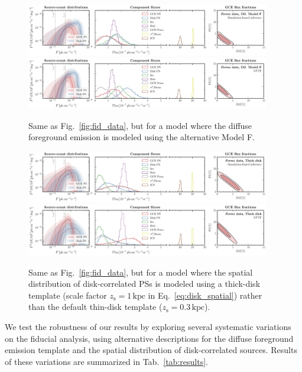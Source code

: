 \documentclass[prd,aps,10pt,nofootinbib,twocolumn,superscriptaddress,preprintnumbers,balancelastpage,longbibliography]{revtex4-1}
\begin{document}
%
\begin{figure}
\centering
\includegraphics[width=0.95\textwidth]{plots/data_fid_sbi_modelF.pdf}
\includegraphics[width=0.95\textwidth]{plots/data_fid_nptf_modelF.pdf}
\caption{Same as Fig.~\ref{fig:fid_data}, but for a model where the diffuse foreground emission is modeled using the alternative Model F.}
\label{fig:fid_data_modelF}
\end{figure}
%

%
\begin{figure}
\centering
\includegraphics[width=0.95\textwidth]{plots/data_fid_sbi_thick.pdf}
\includegraphics[width=0.95\textwidth]{plots/data_fid_nptf_thick.pdf}
\caption{Same as Fig.~\ref{fig:fid_data}, but for a model where the spatial distribution of disk-correlated PSs is modeled using a thick-disk template (scale factor $z_\mathrm{s}=1\,\mathrm{kpc}$ in Eq.~\eqref{eq:disk_spatial}) rather than the default thin-disk template ($z_\mathrm{s}=0.3\,\mathrm{kpc}$).}
\label{fig:fid_data_thick_disk}
\end{figure}
%


We test the robustness of our results by exploring several systematic variations on the fiducial analysis, using alternative descriptions for the diffuse foreground emission template and the spatial distribution of disk-correlated sources. Results of these variations are summarized in Tab.~\ref{tab:results}. \\
\end{document}
